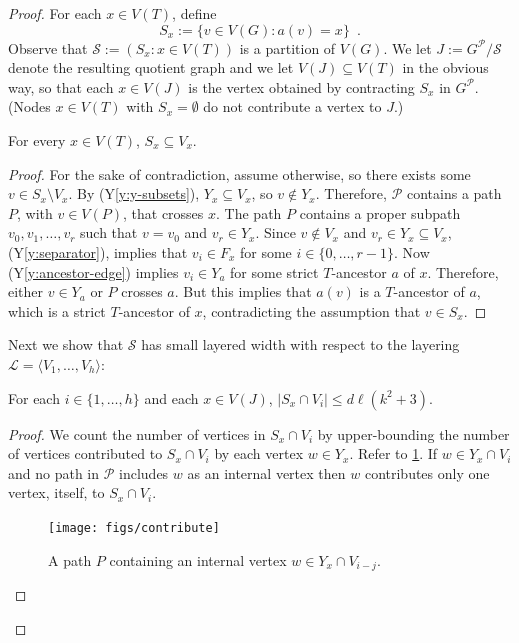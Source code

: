 \documentclass{patmorin}
\newcommand{\yref}[1]{(Y\ref{y:#1})}
\renewcommand{\le}{\leqslant}
\begin{document}
\begin{proof}
For each $x\in V(T)$, define 
\[  
     S_x := \{v\in V(G): a(v)= x\} \enspace .
\]
Observe that $\mathcal{S}:=(S_x : x\in V(T))$ is a partition of $V(G)$.  We let $J:=G^\mathcal{P}/\mathcal{S}$ denote the resulting quotient graph and we let $V(J)\subseteq V(T)$ in the obvious way, so that each $x\in V(J)$ is the vertex obtained by contracting $S_x$ in $G^{\mathcal{P}}$. (Nodes $x\in V(T)$ with $S_x=\emptyset$ do not contribute a vertex to $J$.)

\begin{clm}
  For every $x\in V(T)$, $S_x\subseteq V_x$.
\end{clm}

\begin{proof}
  For the sake of contradiction, assume otherwise, so there exists some $v\in S_x\setminus V_x$. By \yref{y-subsets}, $Y_x\subseteq V_x$, so $v\not\in Y_x$.  Therefore, $\mathcal{P}$ contains a path $P$, with $v\in V(P)$, that crosses $x$.  The path $P$ contains a proper subpath $v_0,v_1,\ldots,v_{r}$ such that $v=v_0$ and $v_r\in Y_x$. Since $v\not\in V_x$ and $v_r\in Y_x\subseteq V_x$, \yref{separator}, implies that $v_i\in F_x$ for some $i\in\{0,\ldots,r-1\}$. Now \yref{ancestor-edge} implies $v_i\in Y_a$ for some strict $T$-ancestor $a$ of $x$.  Therefore, either $v\in Y_a$ or $P$ crosses $a$. But this implies that $a(v)$ is a $T$-ancestor of $a$, which is a strict $T$-ancestor of $x$, contradicting the assumption that $v\in S_x$.
\end{proof}

Next we show that $\mathcal{S}$ has small layered width with respect to the layering $\mathcal{L}=\langle V_1,\ldots,V_h\rangle$:

\begin{clm}
  For each $i\in\{1,\ldots,h\}$ and each $x\in V(J)$, $|S_x\cap V_i|\le d\ell(k^2+3)$.  
\end{clm}

\begin{proof}
  We count the number of vertices in $S_x\cap V_i$ by upper-bounding the number of vertices contributed to $S_x\cap V_i$ by each vertex $w\in Y_x$. Refer to \cref{contribute}.  If $w\in Y_x\cap V_i$ and no path in $\mathcal{P}$ includes $w$ as an internal vertex then $w$ contributes only one vertex, itself, to $S_x\cap V_i$.
  
  \begin{figure}[htbp]
    \begin{center}
      \texttt{[image: figs/contribute]}
    \end{center}
    \caption{A path $P$ containing an internal vertex $w\in Y_x\cap V_{i-j}$.}
    \label{contribute}
  \end{figure}


\end{proof}
\end{proof}
\end{document}
